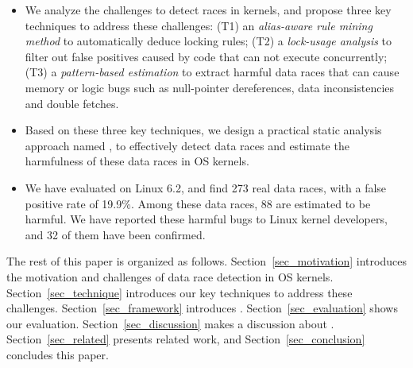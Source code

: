 \begin{itemize}
	\item We analyze the challenges to detect races in kernels, and propose 
	three key techniques to address	these challenges: (T1) an {\em alias-aware 
	rule mining method} to automatically deduce locking rules; (T2) a {\em 
	lock-usage analysis} to filter out false positives caused by code that can 
	not execute concurrently; (T3) a {\em pattern-based estimation} to extract 
	harmful data races that can cause memory or logic bugs such as null-pointer 
	dereferences, data inconsistencies and double fetches.		
	\item Based on these three key techniques, we design a practical static 	
	analysis approach named \sys, to effectively detect data races and 	
	estimate the harmfulness of these data races in OS kernels.
	\item We have evaluated \sys on Linux 6.2, and find 273 real data races, 	
	with a false positive rate of 19.9\%. Among these data races, 88 are 
	estimated to be harmful. We have reported these harmful bugs to Linux 
	kernel developers, and 32 of them have been confirmed.
\end{itemize}

The rest of this paper is organized as follows. Section~\ref{sec_motivation} 
introduces the motivation and challenges of data race detection in OS kernels. 
Section~\ref{sec_technique} introduces our key techniques to address these 
challenges. Section~\ref{sec_framework} introduces \sys. 
Section~\ref{sec_evaluation} shows our evaluation. Section~\ref{sec_discussion} 
makes a discussion about \sys. Section~\ref{sec_related} presents related 
work, and Section~\ref{sec_conclusion} concludes this paper.
